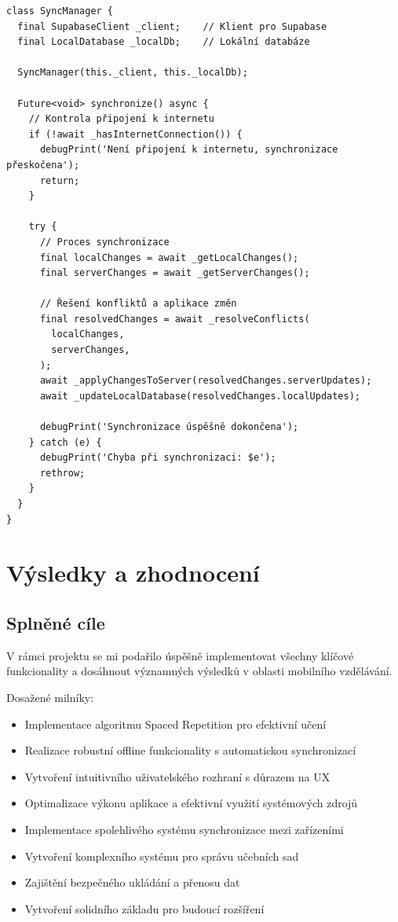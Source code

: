 \documentclass[12pt, a4paper, twoside, openright]{report}
\begin{document}
	\begin{lstlisting}[style=Python, caption=Implementace synchronizace]
class SyncManager {
  final SupabaseClient _client;    // Klient pro Supabase
  final LocalDatabase _localDb;    // Lokální databáze

  SyncManager(this._client, this._localDb);

  Future<void> synchronize() async {
    // Kontrola připojení k internetu
    if (!await _hasInternetConnection()) {
      debugPrint('Není připojení k internetu, synchronizace přeskočena');
      return;
    }

    try {
      // Proces synchronizace
      final localChanges = await _getLocalChanges();
      final serverChanges = await _getServerChanges();
      
      // Řešení konfliktů a aplikace změn
      final resolvedChanges = await _resolveConflicts(
        localChanges,
        serverChanges,
      );
      await _applyChangesToServer(resolvedChanges.serverUpdates);
      await _updateLocalDatabase(resolvedChanges.localUpdates);
      
      debugPrint('Synchronizace úspěšně dokončena');
    } catch (e) {
      debugPrint('Chyba při synchronizaci: $e');
      rethrow;
    }
  }
}
	\end{lstlisting}

\chapter{Výsledky a zhodnocení}
	\section{Splněné cíle}
	V rámci projektu se mi podařilo úspěšně implementovat všechny klíčové funkcionality a dosáhnout významných výsledků v oblasti mobilního vzdělávání.

	Dosažené milníky:
	\begin{itemize}
		\item Implementace algoritmu Spaced Repetition pro efektivní učení
		\item Realizace robustní offline funkcionality s automatickou synchronizací
		\item Vytvoření intuitivního uživatelského rozhraní s důrazem na UX
		\item Optimalizace výkonu aplikace a efektivní využití systémových zdrojů
		\item Implementace spolehlivého systému synchronizace mezi zařízeními
		\item Vytvoření komplexního systému pro správu učebních sad
		\item Zajištění bezpečného ukládání a přenosu dat
		\item Vytvoření solidního základu pro budoucí rozšíření
	\end{itemize}
\end{document}
